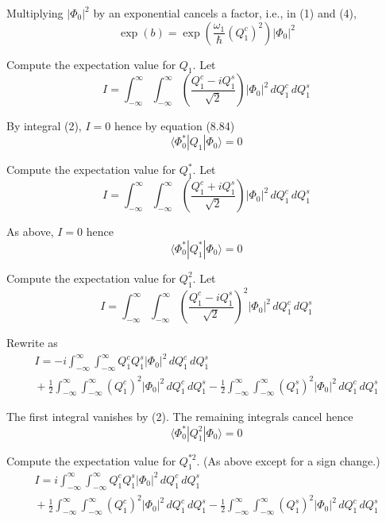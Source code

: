 Multiplying $\vert\Phi_0\vert^2$ by an exponential cancels a factor, i.e., in (1) and (4),
\begin{equation*}
\exp(b)=\exp\left(\frac{\omega_1}{\hbar}(Q_1^c)^2\right)\vert\Phi_0\vert^2
\end{equation*}

Compute the expectation value for $Q_1$.
Let
\begin{equation*}
I=\int_{-\infty}^\infty\int_{-\infty}^\infty
\left(\frac{Q_1^c-iQ_1^s}{\sqrt2}\right)
\vert\Phi_0\vert^2\,dQ_1^c\,dQ_1^s
\end{equation*}

By integral (2), $I=0$ hence by equation (8.84)
\begin{equation*}
\langle\Phi_0^*|Q_1|\Phi_0\rangle=0
\end{equation*}

Compute the expectation value for $Q_1^*$.
Let
\begin{equation*}
I=\int_{-\infty}^\infty\int_{-\infty}^\infty
\left(\frac{Q_1^c+iQ_1^s}{\sqrt2}\right)
\vert\Phi_0\vert^2\,dQ_1^c\,dQ_1^s
\end{equation*}

As above, $I=0$ hence
\begin{equation*}
\langle\Phi_0^*|Q_1^*|\Phi_0\rangle=0
\end{equation*}

Compute the expectation value for $Q_1^2$.
Let
\begin{equation*}
I=\int_{-\infty}^\infty\int_{-\infty}^\infty
\left(\frac{Q_1^c-iQ_1^s}{\sqrt2}\right)^2
\vert\Phi_0\vert^2\,dQ_1^c\,dQ_1^s
\end{equation*}

Rewrite as
\begin{multline*}
I=-i\int_{-\infty}^\infty\int_{-\infty}^\infty
Q_1^cQ_1^s
\vert\Phi_0\vert^2\,dQ_1^c\,dQ_1^s
\\
{}+\frac{1}{2}
\int_{-\infty}^\infty\int_{-\infty}^\infty
(Q_1^c)^2
\vert\Phi_0\vert^2\,dQ_1^c\,dQ_1^s
-\frac{1}{2}
\int_{-\infty}^\infty\int_{-\infty}^\infty
(Q_1^s)^2
\vert\Phi_0\vert^2\,dQ_1^c\,dQ_1^s
\end{multline*}

The first integral vanishes by (2).
The remaining integrals cancel hence
\begin{equation*}
\langle\Phi_0^*|Q_1^2|\Phi_0\rangle=0
\end{equation*}

Compute the expectation value for $Q_1^{*2}$.
(As above except for a sign change.)
\begin{multline*}
I=i\int_{-\infty}^\infty\int_{-\infty}^\infty
Q_1^cQ_1^s
\vert\Phi_0\vert^2\,dQ_1^c\,dQ_1^s
\\
{}+\frac{1}{2}
\int_{-\infty}^\infty\int_{-\infty}^\infty
(Q_1^c)^2
\vert\Phi_0\vert^2\,dQ_1^c\,dQ_1^s
-\frac{1}{2}
\int_{-\infty}^\infty\int_{-\infty}^\infty
(Q_1^s)^2
\vert\Phi_0\vert^2\,dQ_1^c\,dQ_1^s
\end{multline*}


